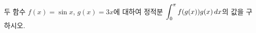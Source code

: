 두 함수 $f(x)=\sin x$, $g(x)=3x$에 대하여 정적분 $\displaystyle\int_{0}^{\pi}f(g(x))g(x)\mkern3mu dx$의 값을 구하시오.
